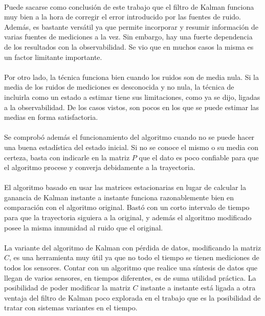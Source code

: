 
	\paragraph{}
	Puede sacarse como conclusión de este trabajo que el filtro de Kalman funciona muy bien a la hora de corregir el error introducido por las fuentes de ruido. Además, es bastante versátil ya que permite incorporar y resumir información de varias fuentes de mediciones a la vez. Sin embargo, hay una fuerte dependencia de los resultados con la observabilidad. Se vio que en muchos casos la misma es un factor limitante importante.
	
	\paragraph{}
	Por otro lado, la técnica funciona bien cuando los ruidos son de media nula. Si la media de los ruidos de mediciones es desconocida y no nula, la técnica de incluirla como un estado a estimar tiene sus limitaciones, como ya se dijo, ligadas a la observabilidad. De los casos vistos, son pocos en los que se puede estimar las medias en forma satisfactoria.
	
	\paragraph{}
	Se comprobó además el funcionamiento del algoritmo cuando no se puede hacer una buena estadística del estado inicial. Si no se conoce el mismo o su media con certeza, basta con indicarle en la matriz $P$ que el dato es poco confiable para que el algoritmo procese y converja debidamente a la trayectoria.
	
	\paragraph{}
	El algoritmo basado en usar las matrices estacionarias en lugar de calcular la ganancia de Kalman instante a instante funciona razonablemente bien en comparación con el algoritmo original. Bastó con un corto intervalo de tiempo para que la trayectoria siguiera a la original, y además el algoritmo modificado posee la misma inmunidad al ruido que el original.
	
	\paragraph{}
	La variante del algoritmo de Kalman con pérdida de datos, modificando la matriz $C$, es una herramienta muy útil ya que no todo el tiempo se tienen mediciones de todos los sensores. Contar con un algoritmo que realice una síntesis de datos que llegan de varios sensores, en tiempos diferentes, es de suma utilidad práctica. La posibilidad de poder modificar la matriz $C$ instante a instante está ligada a otra ventaja del filtro de Kalman poco explorada en el trabajo que es la posibilidad de tratar con sistemas variantes en el tiempo.
	

